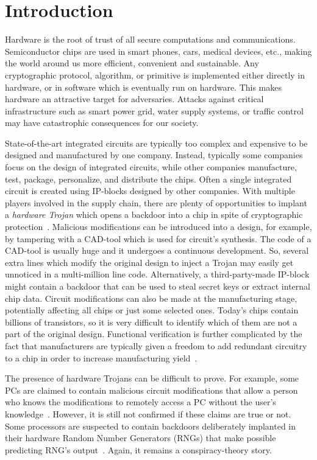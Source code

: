 \documentclass[a4paper]{llncs}
\begin{document}
\section{Introduction} \label{intr}

Hardware is the root of trust of all secure computations and communications. Semiconductor chips are used in smart phones, cars, medical devices, etc., making the world around us more efficient, convenient and sustainable. Any cryptographic protocol, algorithm, or primitive is implemented either directly in hardware, or in software which is eventually run on hardware. This makes hardware an attractive target for adversaries. Attacks against critical infrastructure such as smart power grid, water supply systems, or traffic control may have catastrophic consequences for our society.

State-of-the-art integrated circuits are typically too complex and expensive to be designed and manufactured by one company. Instead, typically some companies focus on the design of integrated circuits, while other companies manufacture, test, package, personalize, and distribute the chips. Often a single integrated circuit is created using IP-blocks designed by other companies. With multiple players involved in the supply chain, there are plenty of opportunities to implant a {\em hardware Trojan} which opens a backdoor into a chip in spite of cryptographic protection~\cite{MiWW15}. Malicious modifications can be introduced into a design, for example, by tampering with a CAD-tool which is used for circuit's synthesis. The code of a CAD-tool is usually huge and it undergoes a continuous development. So, several extra lines which modify the original design to inject a Trojan may easily get unnoticed in a multi-million line code. Alternatively, a third-party-made IP-block might contain a backdoor that can be used to steal secret keys or extract internal chip data. Circuit modifications can also be made at the manufacturing stage, potentially affecting all chips or just some selected ones. Today's chips contain billions of transistors, so it is very difficult to identify which of them are not a part of the original design. Functional verification is further complicated by the fact that manufacturers are typically given a freedom to add redundant circuitry to a chip in order to increase manufacturing yield~\cite{GuP11}. 

The presence of hardware Trojans can be difficult to prove. For example, some PCs are claimed to contain malicious circuit modifications that allow a person who knows the modifications to remotely access a PC without the user's knowledge~\cite{lenovo}. However, it is still not confirmed if these claims are true or not. Some processors are suspected to contain backdoors deliberately implanted in their hardware Random Number Generators (RNGs) that make possible predicting RNG's output~\cite{intel_pr}. Again, it remains a conspiracy-theory story. 
\end{document}
